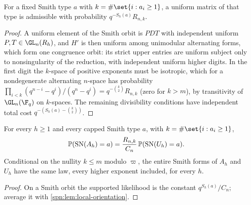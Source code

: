 \begin{lemma}\label{spn:lem:local-orientation}
For a fixed Smith type $a$ with $k=\#\set{i:a_i\ge1}$, a uniform matrix of that type is admissible
with probability $q^{-S_h(a)}R_{n,k}$.
\end{lemma}
\begin{proof}
A uniform element of the Smith orbit is $PDT$ with independent uniform $P,T\in\GL_n(R_h)$, and $H'$ is
then uniform among unimodular alternating forms, which form one congruence orbit: its strict upper
entries are uniform subject only to nonsingularity of the reduction, with independent uniform higher
digits. In the first digit the $k$-space of positive exponents must be isotropic, which for a
nondegenerate alternating $n$-space has probability
$\prod_{i<k}(q^{n-i}-q^i)/(q^n-q^i)=q^{-\binom k2}R_{n,k}$ (zero for $k>m$), by transitivity of
$\GL_n(\F_q)$ on $k$-spaces. The remaining divisibility conditions have independent total cost
$q^{-(S_h(a)-\binom k2)}$.
\end{proof}

\begin{theorem}\label{spn:thm:local-smith}
For every $h\ge1$ and every capped Smith type $a$, with $k=\#\set{i:a_i\ge1}$,
\[
 \mathbb{P}(\mathrm{SN}(A_h)=a)=\frac{R_{n,k}}{C_n}\,\mathbb{P}(\mathrm{SN}(U_h)=a).
\]
Conditional on the nullity $k\le m$ modulo $\varpi$, the entire Smith forms of $A_h$ and $U_h$ have
the same law, every higher exponent included, for every $h$.
\end{theorem}
\begin{proof}
On a Smith orbit the supported likelihood is the constant $q^{S_h(a)}/C_n$; average it with
\cref{spn:lem:local-orientation}.
\end{proof}

